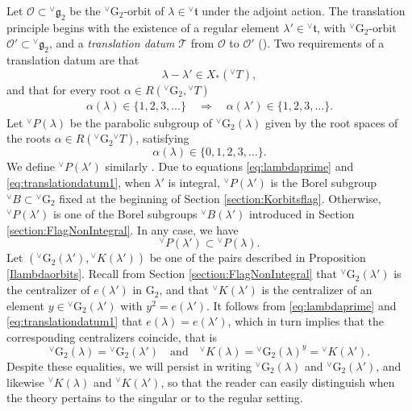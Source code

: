 \documentclass[a4paper, 11pt]{article}
\begin{document}
Let $\mathcal{O} \subset  {^\vee}\mathfrak{g}_2$ be the
${^\vee}\mathrm{G}_{2}$-orbit of  $\lambda 
\in {^\vee}\mathfrak{t}$ under the adjoint action.
The translation principle begins with the existence of a regular
element $\lambda' \in  {}^{\vee}\mathfrak{t}$, with 
\({^\vee}\mathrm{G}_2\)-orbit \(\mathcal{O}' \subset
  {^\vee}\mathfrak{g}_2\),  and a
  \emph{translation datum} \(\mathcal{T}\) from \(\mathcal{O}\) to
  \(\mathcal{O}'\) (\cite[Definition 8.6, Lemma 8.7]{ABV}). Two
  requirements of a translation datum are that
\begin{equation}\label{eq:lambdaprime}
\lambda - \lambda' \in X_*( {^\vee}T),
\end{equation}
and that for every root $\alpha \in
R({}^{\vee}\mathrm{G}_{2}, {}^{\vee}T)$
\begin{align}\label{eq:translationdatum1}
\alpha(\lambda) \in \{1,2,3, \ldots \}
\quad \Longrightarrow \quad 
\alpha(\lambda') \in \{1,2,3, \ldots\}.
\end{align}
Let \({}^{\vee}P(\lambda)\) be the parabolic subgroup of
\({}^{\vee}\mathrm{G}_{2}(\lambda)\) given by the root spaces of the roots
$\alpha \in R( {^\vee}\mathrm{G}_{2} {^\vee}T)$, satisfying 
$$\alpha(\lambda) \in \{0, 1,2,3, \ldots \}.$$
We define \({}^{\vee}P(\lambda')\) similarly \cite[(6.1),
  (6.2)]{ABV}. Due to equations \eqref{eq:lambdaprime} and
\eqref{eq:translationdatum1}, when \(\lambda'\) is integral,
\({}^{\vee}P(\lambda')\) is the Borel subgroup
\({^\vee}B \subset {}^{\vee}\mathrm{G}_{2}\) fixed at the beginning of Section
\ref{section:Korbitsflag}. Otherwise,  \({}^{\vee}P(\lambda')\) is one
of the Borel subgroups ${^\vee}B(\lambda')$
introduced in Section \ref{section:FlagNonIntegral}. In any case, we
have 
\[
{}^{\vee}P(\lambda') \subset {}^{\vee}P(\lambda).
\]
Let $\left({}^{\vee}\mathrm{G}_{2}(\lambda'),
{}^{\vee}K(\lambda')\right)$ be one of the pairs described in
Proposition \ref{Ilambdaorbits}. Recall from Section
\ref{section:FlagNonIntegral} that ${^\vee}\mathrm{G}_{2}(\lambda')$
is the centralizer of $e(\lambda')$ in $\mathrm{G}_{2}$, and that
${^\vee}K(\lambda')$ is the centralizer of an element $y \in
{^\vee}\mathrm{G}_{2}(\lambda')$ with $y^2 = e(\lambda')$. It follows
from  \eqref{eq:lambdaprime} and \eqref{eq:translationdatum1}
that $e(\lambda) = e(\lambda')$, which in turn implies that the
corresponding centralizers coincide, that is 
\[
{^\vee}\mathrm{G}_{2}(\lambda) = {^\vee}\mathrm{G}_{2}(\lambda') \quad
\text{and} \quad 
{^\vee}K(\lambda) = {^\vee}\mathrm{G}_{2}(\lambda)^y= {^\vee}K(\lambda').
\]
Despite these equalities, we will persist in  writing 
${^\vee}\mathrm{G}_{2}(\lambda)$ and
${^\vee}\mathrm{G}_{2}(\lambda')$, and likewise  
${^\vee}K(\lambda)$ and ${^\vee}K(\lambda')$, so that the reader can
easily distinguish when the theory pertains to the singular or to the regular
setting.  
\end{document}
